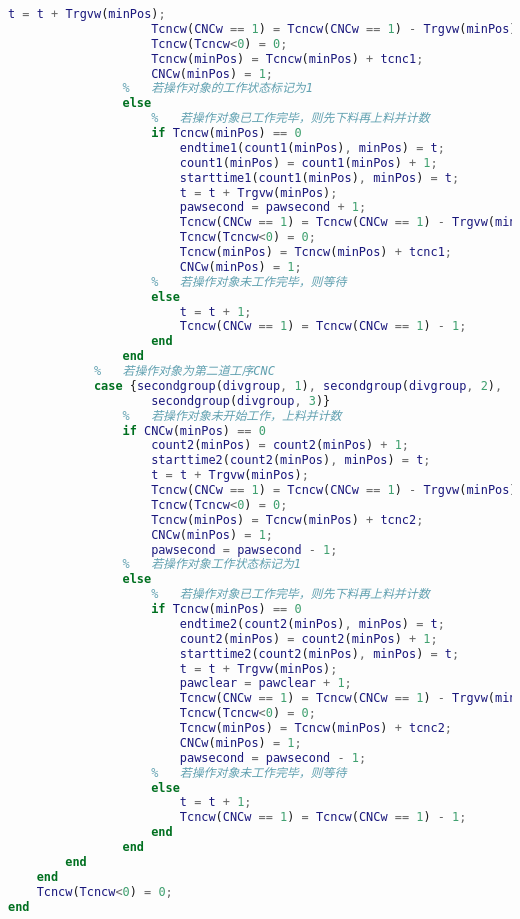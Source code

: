 \documentclass[no-math,withoutpreface,bwprint]{cumcmthesis} %
\numberwithin{equation}{section}
\numberwithin{figure}{section}
\numberwithin{table}{section}
\begin{document}
\begin{lstlisting}[language=matlab]
                    t = t + Trgvw(minPos);
                    Tcncw(CNCw == 1) = Tcncw(CNCw == 1) - Trgvw(minPos);
                    Tcncw(Tcncw<0) = 0;
                    Tcncw(minPos) = Tcncw(minPos) + tcnc1;
                    CNCw(minPos) = 1;
                %   若操作对象的工作状态标记为1
                else
                    %   若操作对象已工作完毕，则先下料再上料并计数
                    if Tcncw(minPos) == 0
                        endtime1(count1(minPos), minPos) = t;
                        count1(minPos) = count1(minPos) + 1;
                        starttime1(count1(minPos), minPos) = t;
                        t = t + Trgvw(minPos);
                        pawsecond = pawsecond + 1;
                        Tcncw(CNCw == 1) = Tcncw(CNCw == 1) - Trgvw(minPos);
                        Tcncw(Tcncw<0) = 0;
                        Tcncw(minPos) = Tcncw(minPos) + tcnc1;
                        CNCw(minPos) = 1;
                    %   若操作对象未工作完毕，则等待
                    else
                        t = t + 1;
                        Tcncw(CNCw == 1) = Tcncw(CNCw == 1) - 1;
                    end
                end
            %   若操作对象为第二道工序CNC
            case {secondgroup(divgroup, 1), secondgroup(divgroup, 2), ...
                    secondgroup(divgroup, 3)}
                %   若操作对象未开始工作，上料并计数
                if CNCw(minPos) == 0
                    count2(minPos) = count2(minPos) + 1;
                    starttime2(count2(minPos), minPos) = t;
                    t = t + Trgvw(minPos);
                    Tcncw(CNCw == 1) = Tcncw(CNCw == 1) - Trgvw(minPos);
                    Tcncw(Tcncw<0) = 0;
                    Tcncw(minPos) = Tcncw(minPos) + tcnc2;
                    CNCw(minPos) = 1;
                    pawsecond = pawsecond - 1;
                %   若操作对象工作状态标记为1
                else
                    %   若操作对象已工作完毕，则先下料再上料并计数
                    if Tcncw(minPos) == 0
                        endtime2(count2(minPos), minPos) = t;
                        count2(minPos) = count2(minPos) + 1;
                        starttime2(count2(minPos), minPos) = t;
                        t = t + Trgvw(minPos);
                        pawclear = pawclear + 1;
                        Tcncw(CNCw == 1) = Tcncw(CNCw == 1) - Trgvw(minPos);
                        Tcncw(Tcncw<0) = 0;
                        Tcncw(minPos) = Tcncw(minPos) + tcnc2;
                        CNCw(minPos) = 1;
                        pawsecond = pawsecond - 1;
                    %   若操作对象未工作完毕，则等待
                    else
                        t = t + 1;
                        Tcncw(CNCw == 1) = Tcncw(CNCw == 1) - 1;
                    end
                end
        end
    end
    Tcncw(Tcncw<0) = 0;
end


\end{lstlisting}
\end{document}
